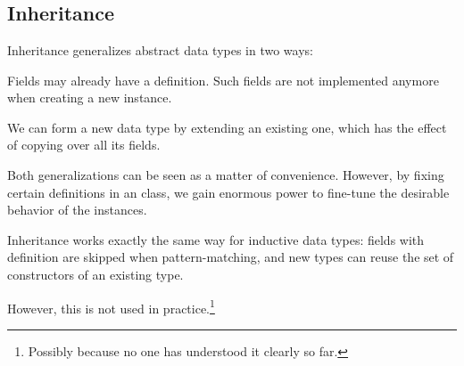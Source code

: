 \begin{commgrammar}
\\
\\
\\
\\
\\
\\
\\
\\
\\
\\
\\
\\
\\
\\
\\
\end{commgrammar}


\subsection{Inheritance}

Inheritance generalizes abstract data types in two ways:
\begin{compactitem}
 \item Fields may already have a definition. Such fields are not implemented anymore when creating a new instance.
 \item We can form a new data type by extending an existing one, which has the effect of copying over all its fields.
\end{compactitem}

Both generalizations can be seen as a matter of convenience.
However, by fixing certain definitions in an class, we gain enormous power to fine-tune the desirable behavior of the instances.

\begin{remark}
Inheritance works exactly the same way for inductive data types: fields with definition are skipped when pattern-matching, and new types can reuse the set of constructors of an existing type.

However, this is not used in practice.\footnote{Possibly because no one has understood it clearly so far.}
\end{remark}

